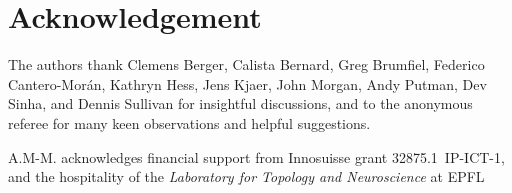 \section*{Acknowledgement}

The authors thank Clemens Berger, Calista Bernard, Greg Brumfiel, Federico Cantero-Mor\'an, Kathryn Hess, Jens Kjaer, John Morgan, Andy Putman, Dev Sinha, and Dennis Sullivan for insightful discussions, and to the anonymous referee for many keen observations and helpful suggestions.

A.M-M. acknowledges financial support from Innosuisse grant \mbox{32875.1 IP-ICT-1}, and the hospitality of the \textit{Laboratory for Topology and Neuroscience} at EPFL